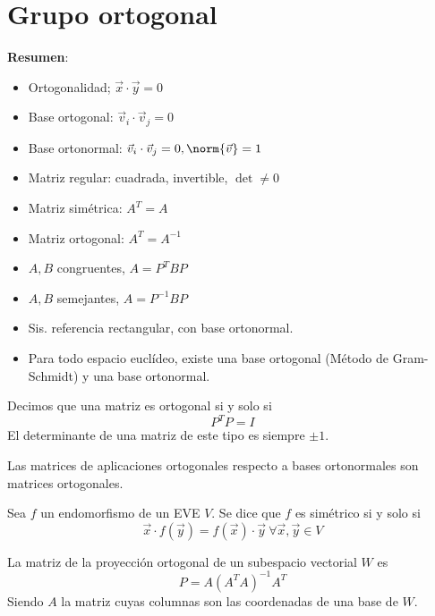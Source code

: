 \documentclass{./Geometria.tex}
\begin{document}
\chapter{Grupo ortogonal}
\textbf{Resumen}:
\begin{itemize}
    \item Ortogonalidad; \(\vec{x} \cdot \vec{y} = 0\)
    \item Base ortogonal: \(\vec{v}_i \cdot \vec{v}_j = 0\)
    \item Base ortonormal: \(\vec{v}_i \cdot \vec{v}_j = 0, \norm{\vec{v}} = 1\)
    \item Matriz regular: cuadrada, invertible, \(\det \neq 0\)
    \item Matriz simétrica: \(A^{T} = A\)
    \item Matriz ortogonal: \(A^{T} = A^{-1}\)
    \item \(A,B\) congruentes, \(A = P^{T}BP\)
    \item \(A,B\) semejantes, \(A = P^{-1}BP\)
    \item Sis. referencia rectangular, con base ortonormal.
    \item Para todo espacio euclídeo, existe una base ortogonal (Método de Gram-Schmidt) y una base ortonormal.
\end{itemize}
\begin{defin}
    Decimos que una matriz es ortogonal si y solo si
    \[
        P^{T}P = I
    \]
    El determinante de una matriz de este tipo es siempre \(\pm 1\).
\end{defin}
\begin{teorema}
    Las matrices de aplicaciones ortogonales respecto a bases ortonormales son matrices
    ortogonales.
\end{teorema}
\begin{defin}
    Sea \(f\) un endomorfismo de un EVE \(V\). Se dice que \(f\) es simétrico si y solo si
    \[
        \vec{x} \cdot f(\vec{y}) = f(\vec{x})\cdot \vec{y}~ \forall \vec{x}, \vec{y} \in V
    \]
\end{defin}
\begin{defin}
    La matriz de la proyección ortogonal de un subespacio vectorial \(W\) es
    \[
        P = A(A^{T}A)^{-1}A^{T}
    \]
    Siendo \(A\) la matriz cuyas columnas son las coordenadas de una base de \(W\).
\end{defin}
\end{document}

